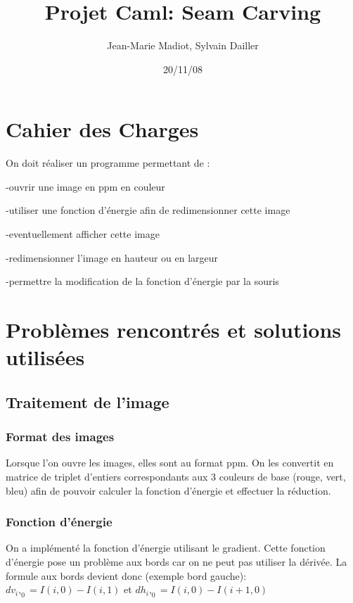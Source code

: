 \documentclass{article}
\title{Projet Caml: Seam Carving}
\author{Jean-Marie Madiot, Sylvain Dailler}
\date{20/11/08}
\begin{document}
\maketitle{}

\section{Cahier des Charges}

On doit réaliser un programme permettant de :
\item{-ouvrir une image en ppm en couleur}
\item{-utiliser une fonction d'énergie afin de redimensionner cette image}
\item{-eventuellement afficher cette image}
\item{-redimensionner l'image en hauteur ou en largeur}
\item{-permettre la modification de la fonction d'énergie par la souris}

\section{Problèmes rencontrés et solutions utilisées}



\subsection{Traitement de l'image}

\subsubsection{Format des images}

Lorsque l'on ouvre les images, elles sont au format ppm. On les convertit en matrice de triplet d'entiers correspondants aux 3 couleurs de base (rouge, vert, bleu) afin de pouvoir calculer la fonction d'énergie et effectuer la réduction. 

\subsubsection{Fonction d'énergie}

On a implémenté la fonction d'énergie utilisant le gradient. Cette fonction d'énergie pose un problème aux bords car on ne peut pas utiliser la dérivée. La formule aux bords devient donc (exemple bord gauche):
$dv_i,_0=I(i,0)-I(i,1)$ et $dh_i,_0 = I(i,0)-I(i+1,0)$
\end{document}
